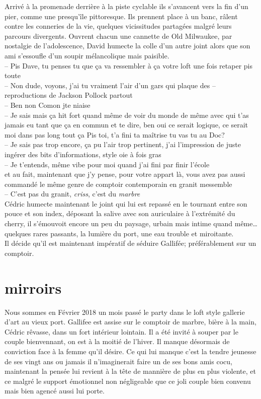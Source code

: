 \documentclass{article}
\begin{document}
Arrivé à la promenade derrière à la piste cyclable ils s'avancent vers la
fin d'un pier, comme une presqu'île pittoresque.
Ils prennent place à un
banc, râlent contre les conneries de la vie, quelques vicissitudes partagées
malgré leurs parcours divergents. Ouvrent chacun une cannette de Old Milwaukee,
par nostalgie de l'adolescence, David humecte la colle d'un autre joint alors que
son ami s'essoufle d'un soupir mélancolique mais paisible. \\
-- Pis Dave, tu penses tu que ça va ressembler à ça votre loft une fois retaper pis toute\\
-- Non dude, voyons, j'ai tu vraiment l'air d'un gars qui plaque des
-- reproductions de Jackson Pollock partout \\
-- Ben non Comon jte niaise\\
-- Je sais mais ça hit fort quand même de voir du monde de même avec qui
t'as jamais eu tant que ça en commun et te dire, ben oui ce serait logique,
ce serait moi dans pas long tout ça \textelp{} Pis toi, t'a fini ta maîtrise tu
vas tu au Doc?\\
-- Je sais pas trop encore, ça pu l'air trop pertinent, j'ai l'impression
de juste ingérer des bits d'informations, style oie à fois gras\\
-- Je t'entends, même vibe pour moi quand j'ai fini par finir l'école\\

\textelp{} et au fait, maintenant que j'y pense, pour votre appart là, vous
avez pas aussi commandé le même genre de comptoir contemporain en granit
messemble\\
-- C'est pas du granit, \emph{criss}, c'est du \emph{marbre}\\

Cédric humecte maintenant le joint qui lui est repassé en le tournant entre son
pouce et son index, déposant la salive avec son auriculaire à l'extrémité du
cherry, il s'émouvoit encore un peu du paysage, urbain mais intime quand
même\ldots quelques rares passants, la lumière du port, une eau trouble et
miroitante.\\[1ex]
Il décide qu'il est maintenant impératif de séduire Gallifée; préférablement sur un comptoir.
\clearpage


\section{mirroirs}

Nous sommes en Février 2018 un mois passé le party dans le loft style gallerie
d'art au vieux port. Gallifee est assise sur le comptoir de marbre, bière à la
main, Cédric rêvasse, dans un fort intérieur lointain. Il a été invité à souper
par le couple bienvennant, on est à la moitié de l'hiver. Il manque désormais de
conviction face à la femme qu'il désire. Ce qui lui manque c'est la tendre
jeunesse de ses vingt ans ou jamais il n'imaginerait faire un de ses bons amis
cocu, maintenant la pensée lui revient à la tête de mannière de plus en plus
violente, et ce malgré le support émotionnel non négligeable que ce joli couple
bien convenu mais bien agencé aussi lui porte. \\
\end{document}
